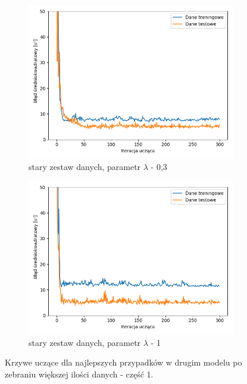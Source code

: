 \documentclass[12pt]{aghdpl}
\begin{document}
		\begin{figure}[h]
			\centering
			\begin{subfigure}{.8\linewidth}
		 		\includegraphics[width =\linewidth]{wykresy/8_zebranie_wiekszej_ilosci_danych/0-200/regularyzacja_0_3_wykres_uczenia.png}
		 		\caption{stary zestaw danych, parametr $\lambda$ - 0,3}
		 	\end{subfigure}
		 	\begin{subfigure}{.8\linewidth}
		 		\includegraphics[width =\linewidth]{wykresy/8_zebranie_wiekszej_ilosci_danych/0-200/regularyzacja_1_wykres_uczenia.png}
		 		\caption{stary zestaw danych, parametr $\lambda$ - 1}
		 	\end{subfigure}
		
			\caption{Krzywe uczące dla najlepszych przypadków w drugim modelu po zebraniu większej ilości danych - część 1.}
			\label{fig: drugi_model_po_zebraniu_wiekszej_ilosci_danych_wykresy_uczenia_1}
		\end{figure}
		
\end{document}
